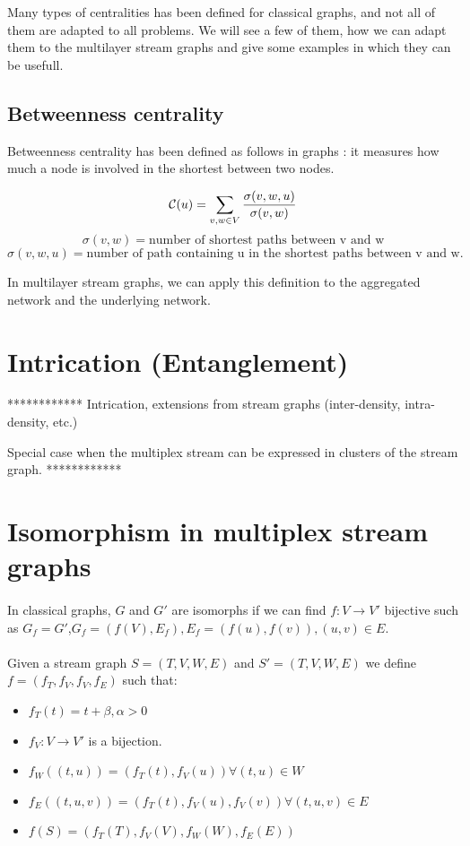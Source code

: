 \documentclass[dvipsnames,a4paper,11pt]{article}
\theoremstyle{definition}
\theoremstyle{remark}
\theoremstyle{remark}
\begin{document}
		Many types of centralities has been defined for classical graphs, and not all of them are adapted to all problems. We will see a few of them, how we can adapt them to the multilayer stream graphs and give some examples in which they can be usefull.
	
		\subsection{Betweenness centrality}
		
		Betweenness	centrality has been defined as follows in graphs : it measures how much a node is involved in the shortest between two nodes.
		
		\[
			{\cal C}(u) = \sum_{v,w \in V} \frac{\sigma(v,w,u)}{\sigma(v,w)} 
			\]
			\[
			\sigma(v,w) = \text{number of shortest paths between v and w} 
			\]\[
			\sigma(v,w,u) = \text{number of path containing u in the shortest paths between v and w.}
		\]
		
		In multilayer stream graphs, we can apply this definition to the aggregated network and the underlying network.
	
	\section{Intrication (Entanglement)}

	************
    Intrication, extensions from stream graphs (inter-density, intra-density, etc.)

    Special case when the multiplex stream can be expressed in clusters of the stream graph.
    ************


    \section{Isomorphism in multiplex stream graphs}
    \paragraph{}
    In classical graphs, $G$ and $G'$ are isomorphs if we can find $f:V \rightarrow V'$ bijective such as $G_f=G'$,$G_f=(f(V),E_f), E_f={(f(u),f(v)), (u,v) \in E}$.
    \paragraph{}
    Given a stream graph $S=(T,V,W,E)$ and $S'=(T,V,W,E)$ we define $f=(f_T,f_V,f_V,f_E)$ such that:
    \begin{itemize}
    	\item $f_T(t)= t + \beta, \alpha > 0$
    	\item $f_V:V\rightarrow V'$ is a bijection.
    	\item $f_W((t,u))=(f_T(t),f_V(u)) \forall (t,u) \in W$
    	\item $f_E((t,u,v))=(f_T(t),f_V(u),f_V(v)) \forall (t,u,v) \in E$
    	\item $f(S)=(f_T(T),f_V(V),f_W(W),f_E(E))$
    \end{itemize}
\end{document}

